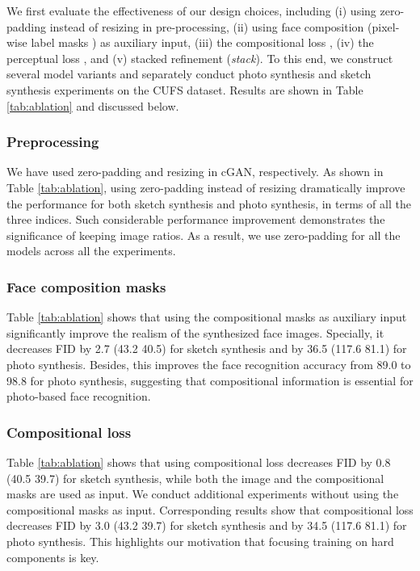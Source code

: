 \documentclass[journal]{IEEEtran}
\begin{document}
We first evaluate the effectiveness of our design choices, including (i) using zero-padding instead of resizing in pre-processing, (ii) using face composition (pixel-wise label masks ) as auxiliary input, (iii) the compositional loss , (iv) the perceptual loss , and (v) stacked refinement (\textit{stack}). To this end, we construct several model variants and separately conduct photo synthesis and sketch synthesis experiments on the CUFS dataset. Results are shown in Table \ref{tab:ablation} and discussed below.

\subsubsection{Preprocessing} \label{ssec:ablation_preproc} We have used zero-padding and resizing in cGAN, respectively. As shown in Table \ref{tab:ablation}, using zero-padding instead of resizing dramatically improve the performance for both sketch synthesis and photo synthesis, in terms of all the three indices. Such considerable performance improvement demonstrates the significance of keeping image ratios. As a result, we use zero-padding for all the models across all the experiments. 

\subsubsection{Face composition masks} Table \ref{tab:ablation} shows that using the compositional masks as auxiliary input significantly improve the realism of the synthesized face images. Specially, it decreases FID by 2.7 (43.2  40.5) for sketch synthesis and by 36.5 (117.6    81.1) for photo synthesis. Besides, this improves the face recognition accuracy from 89.0 to 98.8 for photo synthesis, suggesting that compositional information is essential for photo-based face recognition.

\subsubsection{Compositional loss} Table \ref{tab:ablation} shows that using compositional loss decreases FID by 0.8 (40.5  39.7) for sketch synthesis, while both the image and the compositional masks are used as input. We conduct additional experiments without using the compositional masks as input. Corresponding results show that compositional loss decreases FID by 3.0 (43.2  39.7) for sketch synthesis and by 34.5 (117.6  81.1) for photo synthesis. This highlights our motivation that focusing training on hard components is key. 
\end{document}
